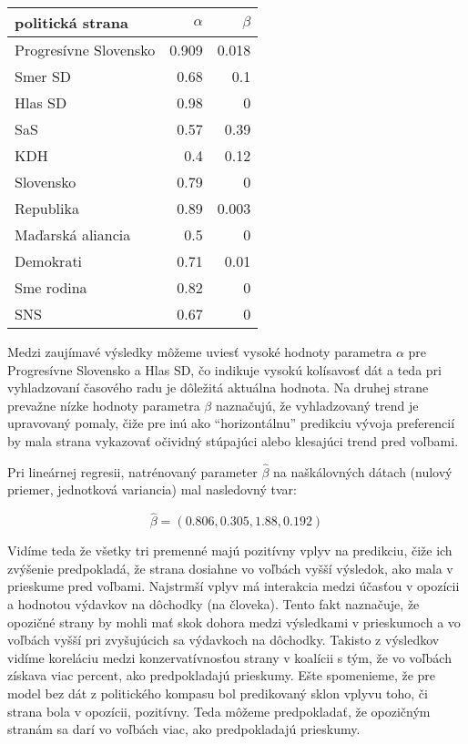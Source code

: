 \documentclass[main.tex]{subfiles}
\begin{document}
\vspace{0.5cm}
\begin{center}
\begin{tabular}{lrr}
	\toprule
	politická strana &  $\alpha$ & $\beta$ \\
	\midrule
	Progresívne Slovensko & 0.909 & 0.018 \\
	Smer SD & 0.68 & 0.1 \\
	Hlas SD & 0.98 & 0 \\
	SaS & 0.57 &  0.39 \\
	KDH & 0.4 & 0.12 \\
	Slovensko & 0.79 & 0 \\
	Republika & 0.89 & 0.003 \\
	Maďarská aliancia & 0.5 & 0 \\
	Demokrati & 0.71 & 0.01 \\
	Sme rodina & 0.82 & 0 \\
	SNS & 0.67 & 0 \\
	\bottomrule
\end{tabular}
\end{center}
\vspace{0.5cm}

Medzi zaujímavé výsledky môžeme uviesť vysoké hodnoty parametra $\alpha$ pre Progresívne Slovensko a Hlas SD, čo indikuje vysokú kolísavosť dát a teda pri vyhladzovaní časového radu je dôležitá aktuálna hodnota. Na druhej strane prevažne nízke hodnoty parametra $\beta$ naznačujú, že vyhladzovaný trend je upravovaný pomaly, čiže pre inú ako \enquote{horizontálnu} predikciu vývoja preferencií by mala strana vykazovať očividný stúpajúci alebo klesajúci trend pred voľbami.

Pri lineárnej regresii, natrénovaný parameter $\hat{\beta}$ na naškálovných dátach (nulový priemer, jednotková variancia) mal nasledovný tvar:

\begin{equation*}
	\hat{\beta} = (0.806, 0.305, 1.88, 0.192)
\end{equation*}

Vidíme teda že všetky tri premenné majú pozitívny vplyv na predikciu, čiže ich zvýšenie predpokladá, že strana dosiahne vo voľbách vyšší výsledok, ako mala v prieskume pred voľbami. Najstrmší vplyv má interakcia medzi účasťou v opozícii a hodnotou výdavkov na dôchodky (na človeka). Tento fakt naznačuje, že opozičné strany by mohli mať skok dohora medzi výsledkami v prieskumoch a vo voľbách vyšší pri zvyšujúcich sa výdavkoch na dôchodky. Takisto z výsledkov vidíme koreláciu medzi konzervatívnosťou strany v koalícii s tým, že vo voľbách získava viac percent, ako predpokladajú prieskumy. Ešte spomenieme, že pre model bez dát z politického kompasu bol predikovaný sklon vplyvu toho, či strana bola v opozícii, pozitívny. Teda môžeme predpokladať, že opozičným stranám sa darí vo voľbách viac, ako predpokladajú prieskumy.
\end{document}
